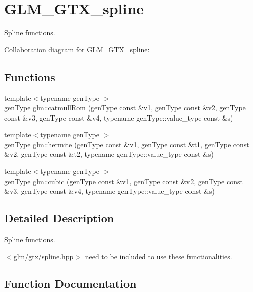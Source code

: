 \hypertarget{group__gtx__spline}{}\section{G\+L\+M\+\_\+\+G\+T\+X\+\_\+spline}
\label{group__gtx__spline}


Spline functions.  


Collaboration diagram for G\+L\+M\+\_\+\+G\+T\+X\+\_\+spline\+:
\subsection*{Functions}
\begin{DoxyCompactItemize}
\item 
{\footnotesize template$<$typename gen\+Type $>$ }\\gen\+Type \hyperlink{group__gtx__spline_ga392c457b16903889ff080038772f6ef2}{glm\+::catmull\+Rom} (gen\+Type const \&v1, gen\+Type const \&v2, gen\+Type const \&v3, gen\+Type const \&v4, typename gen\+Type\+::value\+\_\+type const \&s)
\item 
{\footnotesize template$<$typename gen\+Type $>$ }\\gen\+Type \hyperlink{group__gtx__spline_ga19e4a66ad17ebedc6b8250e8751e7624}{glm\+::hermite} (gen\+Type const \&v1, gen\+Type const \&t1, gen\+Type const \&v2, gen\+Type const \&t2, typename gen\+Type\+::value\+\_\+type const \&s)
\item 
{\footnotesize template$<$typename gen\+Type $>$ }\\gen\+Type \hyperlink{group__gtx__spline_ga1ce22b5ceec4df8c6022990058bcf215}{glm\+::cubic} (gen\+Type const \&v1, gen\+Type const \&v2, gen\+Type const \&v3, gen\+Type const \&v4, typename gen\+Type\+::value\+\_\+type const \&s)
\end{DoxyCompactItemize}


\subsection{Detailed Description}
Spline functions. 

$<$\hyperlink{spline_8hpp}{glm/gtx/spline.\+hpp}$>$ need to be included to use these functionalities. 

\subsection{Function Documentation}
\hypertarget{group__gtx__spline_ga392c457b16903889ff080038772f6ef2}{}
